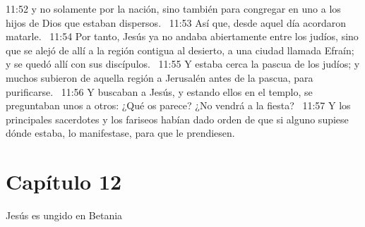 11:52 y no solamente por la nación, sino también para congregar en uno a los hijos de Dios que estaban dispersos.  
11:53 Así que, desde aquel día acordaron matarle.  
11:54 Por tanto, Jesús ya no andaba abiertamente entre los judíos, sino que se alejó de allí a la región contigua al desierto, a una ciudad llamada Efraín; y se quedó allí con sus discípulos.  
11:55 Y estaba cerca la pascua de los judíos; y muchos subieron de aquella región a Jerusalén antes de la pascua, para purificarse.  
11:56 Y buscaban a Jesús, y estando ellos en el templo, se preguntaban unos a otros: ¿Qué os parece? ¿No vendrá a la fiesta?  
11:57 Y los principales sacerdotes y los fariseos habían dado orden de que si alguno supiese dónde estaba, lo manifestase, para que le prendiesen. 
\section*{Capítulo 12 }
Jesús es ungido en Betania   

